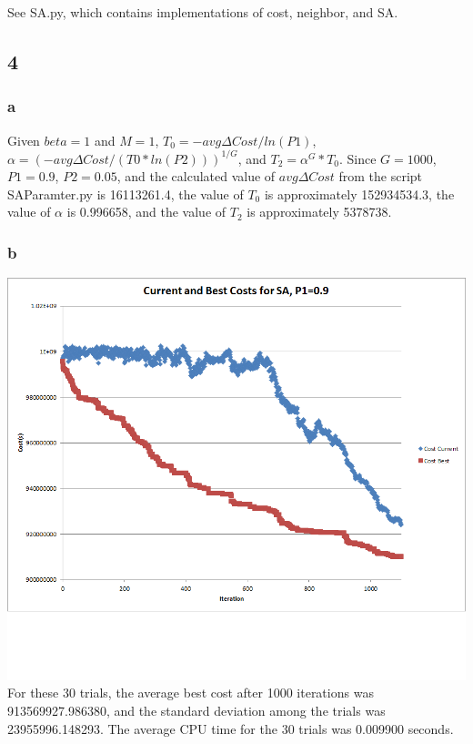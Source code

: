 \documentclass[12pt]{article}
\begin{document}
See SA.py, which contains implementations of cost, neighbor, and SA.

\subsection{4}
\subsubsection{a}
Given $beta = 1$ and $M = 1$, $T_0 =- avg\Delta Cost/ln(P1)$, $\alpha = (-avg\Delta Cost/(T0 * ln(P2)))^{1/G}$, and $T_2 = \alpha^G * T_0$. Since $G = 1000$, $P1 = 0.9$, $P2 = 0.05$, and the calculated value of $avg\Delta Cost$ from the script SAParamter.py is 16113261.4, the value of $T_0$ is approximately 152934534.3, the value of $\alpha$ is 0.996658, and the value of $T_2$ is approximately 5378738.

\subsubsection{b}
\includegraphics[width=\linewidth]{p1_09.png}
For these 30 trials, the average best cost after 1000 iterations was 913569927.986380, and the standard deviation among the trials was 23955996.148293. The average CPU time for the 30 trials was 0.009900 seconds.
\end{document}
